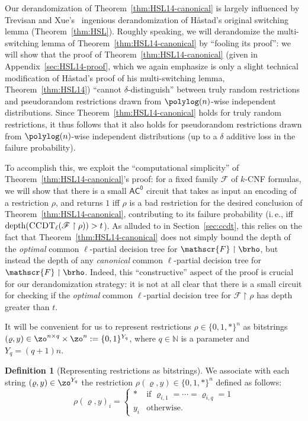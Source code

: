 \documentclass[11pt]{article}
\numberwithin{equation}{section}
\theoremstyle{definition}
\newtheorem{definition}[theorem]{Definition}
\theoremstyle{plain}
\newcommand{\N}{\mathbb N}
\newcommand{\ie}{i.\,e.}
\theoremstyle{plain}
\newcommand{\acz}{\mathsf{AC^0}}
\newcommand{\uhr}{\upharpoonright}
\newcommand{\CCDT}{\textsc{CCDT}}
\newcommand{\depth}{\mathrm{depth}}
\renewcommand{\N}{\mathds{N}}
\begin{document}
Our derandomization of Theorem~\ref{thm:HSL14-canonical} is largely influenced by Trevisan and Xue's~\cite{TX13} ingenious derandomization of H{\aa}stad's original switching lemma (Theorem~\ref{thm:HSL}).  Roughly speaking, we will derandomize the multi-switching lemma of Theorem~\ref{thm:HSL14-canonical} by ``fooling its proof'':  we will show that the proof of Theorem~\ref{thm:HSL14-canonical} (given in Appendix~\ref{sec:HSL14-proof}, which we again emphasize is only a slight technical modification of H{\aa}stad's proof of his multi-switching lemma, Theorem~\ref{thm:HSL14}) ``cannot $\delta$-distinguish'' between truly random restrictions and pseudorandom restrictions drawn from $\polylog(n)$-wise independent distributions.  Since Theorem~\ref{thm:HSL14-canonical} holds for truly random restrictions, it thus follows that it also holds for pseudorandom restrictions drawn from $\polylog(n)$-wise independent distributions (up to a $\delta$ additive loss in the failure probability). 

To accomplish this, we exploit the ``computational simplicity'' of Theorem~\ref{thm:HSL14-canonical}'s proof: for a fixed family $\mathscr{F}$ of $k$-CNF formulas, we will show that there is a small $\acz$ circuit that takes as input an encoding of a restriction $\rho$, and returns $1$ iff $\rho$ is a bad restriction for the desired conclusion of Theorem~\ref{thm:HSL14-canonical}, contributing to its failure probability (\ie, iff $\depth(\CCDT_\ell(\mathscr{F} \uhr \rho)) > t$).   As alluded to in Section~\ref{sec:ccdt}, this relies on the fact that Theorem~\ref{thm:HSL14-canonical} does not simply bound the depth of the \emph{optimal} common $\ell$-partial decision tree for $\mathscr{F} \uhr \brho$, but instead the depth of any \emph{canonical} common $\ell$-partial decision tree for $\mathscr{F} \uhr \brho$. Indeed, this ``constructive'' aspect of the proof  is crucial for our derandomization strategy: it is not at all clear that there is a small circuit for checking if the \emph{optimal} common $\ell$-partial decision tree for $\mathscr{F} \uhr \rho$ has depth greater than $t$.

\medskip 

It will be convenient for us to represent restrictions $\rho \in \{0,1,\ast\}^n$ as bitstrings $(\varrho,y) \in \zo^{n\times q} \times \zo^n := \{0,1\}^{Y_q}$, where $q \in \N$ is a parameter and $Y_q = (q+1)n$.
%


\begin{definition}[Representing restrictions as bitstrings] 
\label{def:string-to-restriction}
We associate with each string $(\varrho,y) \in \zo^{Y_q}$ the restriction $\rho(\varrho,y) \in \{0,1,\ast\}^{n}$ defined as follows: 
\[ 
\rho(\varrho,y)_i  = \begin{cases}
\ast & \text{if $\varrho_{i,1} = \cdots = \varrho_{i,q} = 1$} \\
y_i & \text{otherwise}. 
\end{cases}
\] 
\end{definition} 
\end{document}
